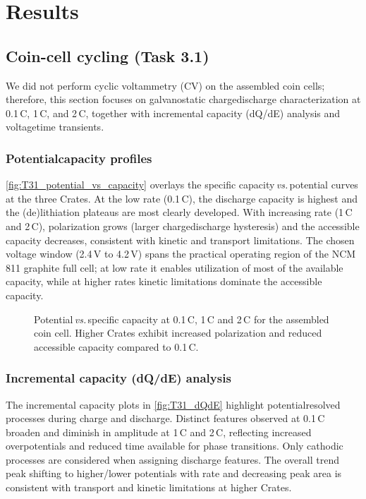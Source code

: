 \chapter{Results}

\section{Coin-cell cycling (Task 3.1)}
We did not perform cyclic voltammetry (CV) on the assembled coin cells; therefore, this section focuses on galvanostatic charge\textendash discharge characterization at 0.1\,C, 1\,C, and 2\,C, together with incremental capacity (dQ/dE) analysis and voltage\textendash time transients.

\subsection{Potential\textendash capacity profiles}
\autoref{fig:T31_potential_vs_capacity} overlays the specific capacity\,\textit{vs.}\,potential curves at the three C\textendash rates. At the low rate (0.1\,C), the discharge capacity is highest and the (de)lithiation plateaus are most clearly developed. With increasing rate (1\,C and 2\,C), polarization grows (larger charge\textendash discharge hysteresis) and the accessible capacity decreases, consistent with kinetic and transport limitations. The chosen voltage window (2.4\,V to 4.2\,V) spans the practical operating region of the NCM\,811\,\textbar\,graphite full cell; at low rate it enables utilization of most of the available capacity, while at higher rates kinetic limitations dominate the accessible capacity.

\begin{figure}[h]
\centering

\caption{Potential\,\textit{vs.}\,specific capacity at 0.1\,C, 1\,C and 2\,C for the assembled coin cell. Higher C\textendash rates exhibit increased polarization and reduced accessible capacity compared to 0.1\,C.}
\label{fig:T31_potential_vs_capacity}
\end{figure}

\subsection{Incremental capacity (dQ/dE) analysis}
The incremental capacity plots in \autoref{fig:T31_dQdE} highlight potential\textendash resolved processes during charge and discharge. Distinct features observed at 0.1\,C broaden and diminish in amplitude at 1\,C and 2\,C, reflecting increased overpotentials and reduced time available for phase transitions. Only cathodic processes are considered when assigning discharge features. The overall trend\,\textemdash\,peak shifting to higher/lower potentials with rate and decreasing peak area\,\textemdash\,is consistent with transport and kinetic limitations at higher C\textendash rates.

